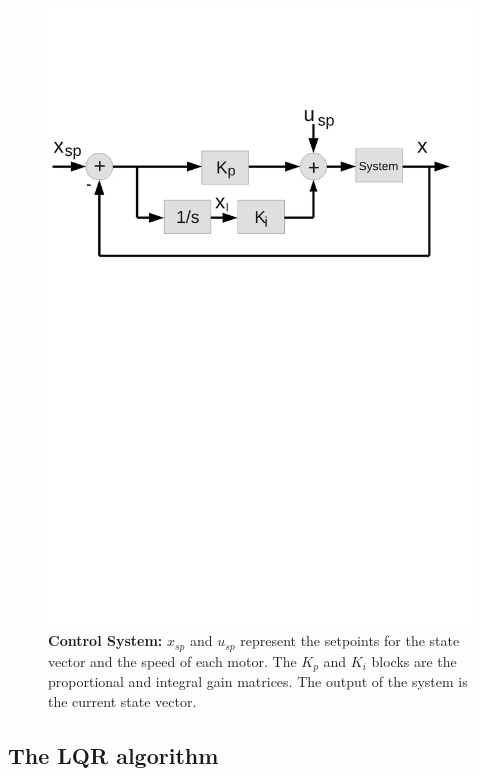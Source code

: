 \documentclass[conference]{IEEEtran}
\begin{document}
\begin{figure}
\vspace{-60pt}
	\centering
	\includegraphics[width=1\columnwidth]{../pics_control/diagrama_bloques_eng.pdf}
\vspace{-220pt}
	\caption{\textbf{Control System:} $x_{sp}$ and $u_{sp}$ represent the setpoints for the state vector and the speed of each motor. The $K_p$ and $K_i$ blocks are the proportional and integral gain matrices. The output of the system is the current state vector.}
	\label{fig:diagrama_bloques_eng.pdf}
\end{figure}

\subsection{The LQR algorithm}
\label{sec:lqr}
\end{document}

